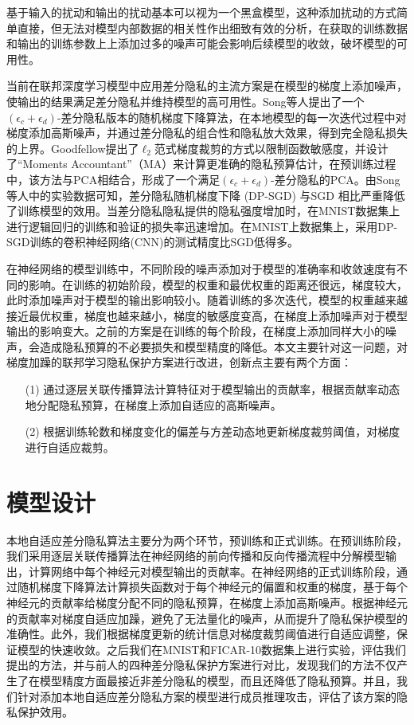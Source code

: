 基于输入的扰动和输出的扰动基本可以视为一个黑盒模型，这种添加扰动的方式简单直接，但无法对模型内部数据的相关性作出细致有效的分析，在获取的训练数据和输出的训练参数上上添加过多的噪声可能会影响后续模型的收敛，破坏模型的可用性。

当前在联邦深度学习模型中应用差分隐私的主流方案是在模型的梯度上添加噪声，使输出的结果满足差分隐私并维持模型的高可用性。Song等人提出了一个$\left(\epsilon_{c}+\epsilon_{d}\right)$-差分隐私版本的随机梯度下降算法，在本地模型的每一次迭代过程中对梯度添加高斯噪声，并通过差分隐私的组合性和隐私放大效果，得到完全隐私损失的上界。Goodfellow提出了$\ell_{2}$范式梯度裁剪的方式以限制函数敏感度，并设计了“Moments Accountant”（MA）来计算更准确的隐私预算估计，在预训练过程中，该方法与PCA相结合，形成了一个满足$\left(\epsilon_{c}+\epsilon_{d}\right)$-差分隐私的PCA。由Song等人中的实验数据可知，差分隐私随机梯度下降 (DP-SGD) 与SGD 相比严重降低了训练模型的效用。当差分隐私隐私提供的隐私强度增加时，在MNIST数据集上进行逻辑回归的训练和验证的损失率迅速增加。在MNIST上数据集上，采用DP-SGD训练的卷积神经网络(CNN)的测试精度比SGD低得多。

在神经网络的模型训练中，不同阶段的噪声添加对于模型的准确率和收敛速度有不同的影响。在训练的初始阶段，模型的权重和最优权重的距离还很远，梯度较大，此时添加噪声对于模型的输出影响较小。随着训练的多次迭代，模型的权重越来越接近最优权重，梯度也越来越小，梯度的敏感度变高，在梯度上添加噪声对于模型输出的影响变大。之前的方案是在训练的每个阶段，在梯度上添加同样大小的噪声，会造成隐私预算的不必要损失和模型精度的降低。本文主要针对这一问题，对梯度加躁的联邦学习隐私保护方案进行改进，创新点主要有两个方面：
\begin{enumerate}
\item [(1)] 通过逐层关联传播算法计算特征对于模型输出的贡献率，根据贡献率动态地分配隐私预算，在梯度上添加自适应的高斯噪声。
\item [(2)] 根据训练轮数和梯度变化的偏差与方差动态地更新梯度裁剪阈值，对梯度进行自适应裁剪。
\end{enumerate}

\section{模型设计}
本地自适应差分隐私算法主要分为两个环节，预训练和正式训练。在预训练阶段，我们采用逐层关联传播算法在神经网络的前向传播和反向传播流程中分解模型输出，计算网络中每个神经元对模型输出的贡献率。在神经网络的正式训练阶段，通过随机梯度下降算法计算损失函数对于每个神经元的偏置和权重的梯度，基于每个神经元的贡献率给梯度分配不同的隐私预算，在梯度上添加高斯噪声。根据神经元的贡献率对梯度自适应加躁，避免了无法量化的噪声，从而提升了隐私保护模型的准确性。此外，我们根据梯度更新的统计信息对梯度裁剪阈值进行自适应调整，保证模型的快速收敛。之后我们在MNIST和FICAR-10数据集上进行实验，评估我们提出的方法，并与前人的四种差分隐私保护方案进行对比，发现我们的方法不仅产生了在模型精度方面最接近非差分隐私的模型，而且还降低了隐私预算。并且，我们针对添加本地自适应差分隐私方案的模型进行成员推理攻击，评估了该方案的隐私保护效用。

